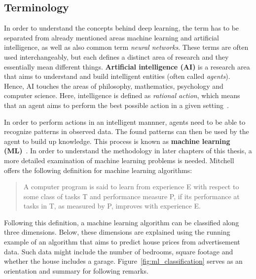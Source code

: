 \subsection{Terminology}
\label{sub:dl_terminology}

In order to understand the concepts behind deep learning, the term has to be
separated from already mentioned areas machine learning and artificial
intelligence, as well as also common term \textit{neural networks}. 
These terms are often used interchangeably, but each defines a distinct area of 
research and they essentially mean different things.
\textbf{Artificial intelligence (AI)} is a research area that aims to understand
and build intelligent entities (often called \textit{agents}). Hence, AI touches the 
areas of philosophy, mathematics, psychology and computer science. Here, 
intelligence is defined as \textit{rational action}, which means that an agent aims
to perform the best possible action in a given setting~\cite{Russell1995}.

In order to perform actions in an intelligent mannner, agents need to be able
to recognize patterns in observed data. The found patterns can then be used
by the agent to build up knowledge. This process is known as \textbf{machine
learning (ML)}~\cite{Goodfellow2016}. In order to understand the methodology in
later chapters of this thesis, a more detailed examination of machine learning
problems is needed. Mitchell~\cite[p. 2]{Mitchell1997} offers the following 
definition for machine learning algorithms:

\begin{quote}
  A computer program is said to learn from experience E with respect to some
  class of tasks T and performance measure P, if its performance at tasks in T,
  as measured by P, improves with experience E.
\end{quote}

Following this definition, a machine learning algorithm can be classified along
three dimensions. Below, these dimensions are explained using the running
example of an algorithm that aims to predict house prices from advertisement data.
Such data might include the number of bedrooms, square footage and whether
the house includes a garage. Figure~\ref{fig:ml_classification} serves as an orientation and summary for
following remarks.

